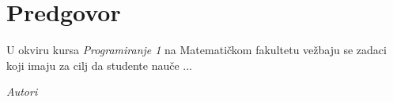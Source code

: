 \chapter*{Predgovor}

U okviru kursa {\em Programiranje 1} na Matematičkom fakultetu vežbaju se zadaci 
koji imaju za cilj da studente nauče  ...





\bigskip

\begin{flushright}
{\em Autori}
\end{flushright}